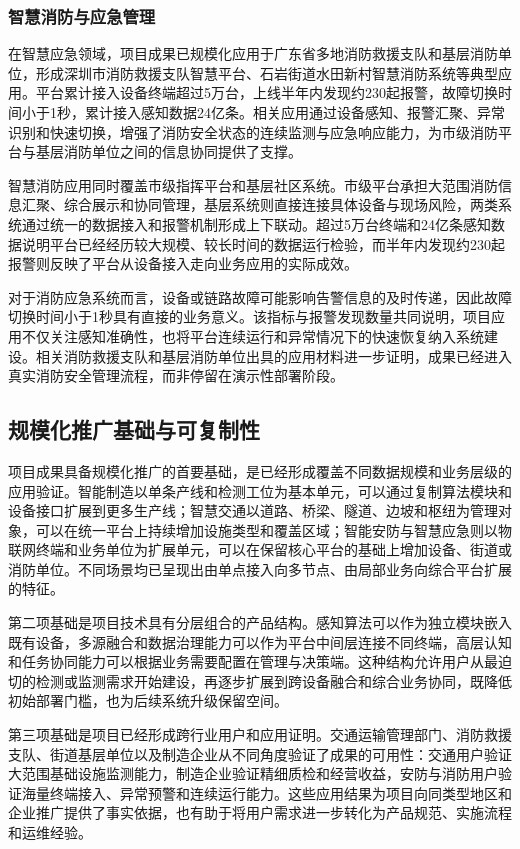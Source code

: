\subsubsection{智慧消防与应急管理}

在智慧应急领域，项目成果已规模化应用于广东省多地消防救援支队和基层消防单位，形成深圳市消防救援支队智慧平台、石岩街道水田新村智慧消防系统等典型应用。平台累计接入设备终端超过5万台，上线半年内发现约230起报警，故障切换时间小于1秒，累计接入感知数据24亿条。相关应用通过设备感知、报警汇聚、异常识别和快速切换，增强了消防安全状态的连续监测与应急响应能力，为市级消防平台与基层消防单位之间的信息协同提供了支撑。

智慧消防应用同时覆盖市级指挥平台和基层社区系统。市级平台承担大范围消防信息汇聚、综合展示和协同管理，基层系统则直接连接具体设备与现场风险，两类系统通过统一的数据接入和报警机制形成上下联动。超过5万台终端和24亿条感知数据说明平台已经经历较大规模、较长时间的数据运行检验，而半年内发现约230起报警则反映了平台从设备接入走向业务应用的实际成效。

对于消防应急系统而言，设备或链路故障可能影响告警信息的及时传递，因此故障切换时间小于1秒具有直接的业务意义。该指标与报警发现数量共同说明，项目应用不仅关注感知准确性，也将平台连续运行和异常情况下的快速恢复纳入系统建设。相关消防救援支队和基层消防单位出具的应用材料进一步证明，成果已经进入真实消防安全管理流程，而非停留在演示性部署阶段。

\subsection{规模化推广基础与可复制性}

项目成果具备规模化推广的首要基础，是已经形成覆盖不同数据规模和业务层级的应用验证。智能制造以单条产线和检测工位为基本单元，可以通过复制算法模块和设备接口扩展到更多生产线；智慧交通以道路、桥梁、隧道、边坡和枢纽为管理对象，可以在统一平台上持续增加设施类型和覆盖区域；智能安防与智慧应急则以物联网终端和业务单位为扩展单元，可以在保留核心平台的基础上增加设备、街道或消防单位。不同场景均已呈现出由单点接入向多节点、由局部业务向综合平台扩展的特征。

第二项基础是项目技术具有分层组合的产品结构。感知算法可以作为独立模块嵌入既有设备，多源融合和数据治理能力可以作为平台中间层连接不同终端，高层认知和任务协同能力可以根据业务需要配置在管理与决策端。这种结构允许用户从最迫切的检测或监测需求开始建设，再逐步扩展到跨设备融合和综合业务协同，既降低初始部署门槛，也为后续系统升级保留空间。

第三项基础是项目已经形成跨行业用户和应用证明。交通运输管理部门、消防救援支队、街道基层单位以及制造企业从不同角度验证了成果的可用性：交通用户验证大范围基础设施监测能力，制造企业验证精细质检和经营收益，安防与消防用户验证海量终端接入、异常预警和连续运行能力。这些应用结果为项目向同类型地区和企业推广提供了事实依据，也有助于将用户需求进一步转化为产品规范、实施流程和运维经验。

